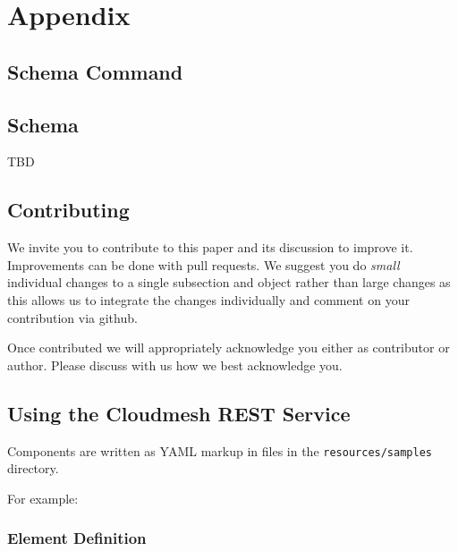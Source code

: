 \documentclass[10pt]{article}
\begin{document}
\newpage

\appendix

\section{Appendix}

\subsection{Schema Command}




\subsection{Schema}\label{a:schema}

TBD


\subsection{Contributing}

We invite you to contribute to this paper and its discussion to
improve it. Improvements can be done with pull requests. We suggest
you do {\em small} individual changes to a single subsection and object
rather than large changes as this allows us to integrate the changes
individually and comment on your contribution via github.

Once contributed we will appropriately acknowledge you either as
contributor or author. Please discuss with us how we best acknowledge
you.

\subsection{Using the Cloudmesh REST Service} 

Components are written as YAML markup in files in the
\verb+resources/samples+ directory.

For example:


\subsubsection{Element Definition}
\end{document}
